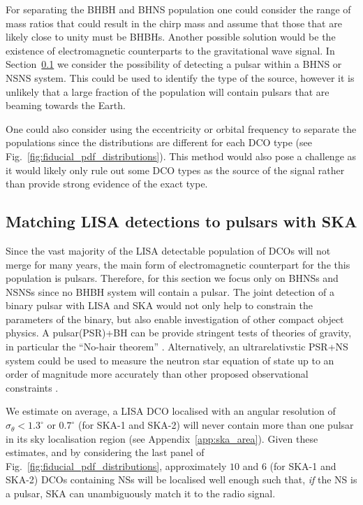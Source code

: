 For separating the BHBH and BHNS population one could consider the range of mass ratios that could result in the chirp mass and assume that those that are likely close to unity must be BHBHs. Another possible solution would be the existence of electromagnetic counterparts to the gravitational wave signal. In Section~\ref{sec:pulsar_matching} we consider the possibility of detecting a pulsar within a BHNS or NSNS system. This could be used to identify the type of the source, however it is unlikely that a large fraction of the population will contain pulsars that are beaming towards the Earth.

One could also consider using the eccentricity or orbital frequency to separate the populations since the distributions are different for each DCO type (see Fig.~\ref{fig:fiducial_pdf_distributions}). This method would also pose a challenge as it would likely only rule out some DCO types as the source of the signal rather than provide strong evidence of the exact type.

\subsection{Matching LISA detections to pulsars with SKA}\label{sec:pulsar_matching}
Since the vast majority of the LISA detectable population of DCOs will not merge for many years, the main form of electromagnetic counterpart for the this population is pulsars. Therefore, for this section we focus only on BHNSs and NSNSs since no BHBH system will contain a pulsar. The joint detection of a binary pulsar with LISA and SKA would not only help to constrain the parameters of the binary, but also enable investigation of other compact object physics. A pulsar(PSR)+BH can be provide stringent tests of theories of gravity, in particular the ``No-hair theorem'' \citep{Keane+2015}. Alternatively, an ultrarelativstic PSR+NS system could be used to measure the neutron star equation of state up to an order of magnitude more accurately than other proposed observational constraints \citep{Kyutoku+2019, Thrane+2020}.

We estimate on average, a LISA DCO localised with an angular resolution of $\sigma_{\theta} < 1.3^\circ$ or $0.7^\circ$ (for SKA-1 and SKA-2) will never contain more than one pulsar in its sky localisation region (see Appendix~\ref{app:ska_area}). Given these estimates, and by considering the last panel of Fig.~\ref{fig:fiducial_pdf_distributions}, approximately $10$ and $6$ (for SKA-1 and SKA-2) DCOs containing NSs will be localised well enough such that, \textit{if} the NS is a pulsar, SKA can unambiguously match it to the radio signal.

